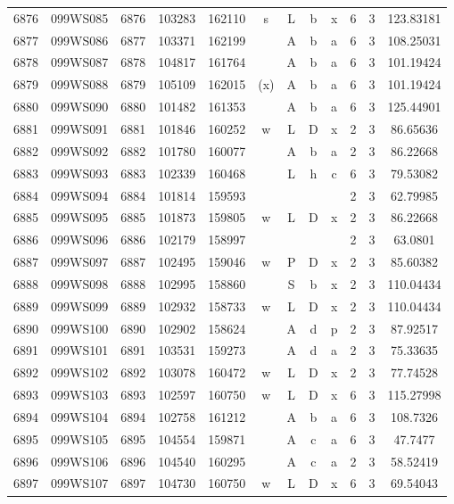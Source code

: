 \begin{tabular}{|*{12}{c|}}
6876 & 099WS085 & 6876 & 103283 & 162110 & s & L & b & x & 6 & 3 & 123.83181 \\ 
6877 & 099WS086 & 6877 & 103371 & 162199 &  & A & b & a & 6 & 3 & 108.25031 \\ 
6878 & 099WS087 & 6878 & 104817 & 161764 &  & A & b & a & 6 & 3 & 101.19424 \\ 
6879 & 099WS088 & 6879 & 105109 & 162015 & (x) & A & b & a & 6 & 3 & 101.19424 \\ 
6880 & 099WS090 & 6880 & 101482 & 161353 &  & A & b & a & 6 & 3 & 125.44901 \\ 
6881 & 099WS091 & 6881 & 101846 & 160252 & w & L & D & x & 2 & 3 & 86.65636 \\ 
6882 & 099WS092 & 6882 & 101780 & 160077 &  & A & b & a & 2 & 3 & 86.22668 \\ 
6883 & 099WS093 & 6883 & 102339 & 160468 &  & L & h & c & 6 & 3 & 79.53082 \\ 
6884 & 099WS094 & 6884 & 101814 & 159593 &  &  &  &  & 2 & 3 & 62.79985 \\ 
6885 & 099WS095 & 6885 & 101873 & 159805 & w & L & D & x & 2 & 3 & 86.22668 \\ 
6886 & 099WS096 & 6886 & 102179 & 158997 &  &  &  &  & 2 & 3 & 63.0801 \\ 
6887 & 099WS097 & 6887 & 102495 & 159046 & w & P & D & x & 2 & 3 & 85.60382 \\ 
6888 & 099WS098 & 6888 & 102995 & 158860 &  & S & b & x & 2 & 3 & 110.04434 \\ 
6889 & 099WS099 & 6889 & 102932 & 158733 & w & L & D & x & 2 & 3 & 110.04434 \\ 
6890 & 099WS100 & 6890 & 102902 & 158624 &  & A & d & p & 2 & 3 & 87.92517 \\ 
6891 & 099WS101 & 6891 & 103531 & 159273 &  & A & d & a & 2 & 3 & 75.33635 \\ 
6892 & 099WS102 & 6892 & 103078 & 160472 & w & L & D & x & 2 & 3 & 77.74528 \\ 
6893 & 099WS103 & 6893 & 102597 & 160750 & w & L & D & x & 6 & 3 & 115.27998 \\ 
6894 & 099WS104 & 6894 & 102758 & 161212 &  & A & b & a & 6 & 3 & 108.7326 \\ 
6895 & 099WS105 & 6895 & 104554 & 159871 &  & A & c & a & 6 & 3 & 47.7477 \\ 
6896 & 099WS106 & 6896 & 104540 & 160295 &  & A & c & a & 2 & 3 & 58.52419 \\ 
6897 & 099WS107 & 6897 & 104730 & 160750 & w & L & D & x & 6 & 3 & 69.54043 \\ 

\end{tabular}
